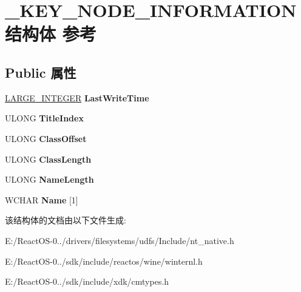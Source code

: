 \hypertarget{struct___k_e_y___n_o_d_e___i_n_f_o_r_m_a_t_i_o_n}{}\section{\+\_\+\+K\+E\+Y\+\_\+\+N\+O\+D\+E\+\_\+\+I\+N\+F\+O\+R\+M\+A\+T\+I\+O\+N结构体 参考}
\label{struct___k_e_y___n_o_d_e___i_n_f_o_r_m_a_t_i_o_n}
\subsection*{Public 属性}
\begin{DoxyCompactItemize}
\item 
\mbox{\label{struct___k_e_y___n_o_d_e___i_n_f_o_r_m_a_t_i_o_n_a415eb44e25bd63e16bd6a5841fb9bbfd}} 
\hyperlink{union___l_a_r_g_e___i_n_t_e_g_e_r}{L\+A\+R\+G\+E\+\_\+\+I\+N\+T\+E\+G\+ER} {\bfseries Last\+Write\+Time}
\item 
\mbox{\label{struct___k_e_y___n_o_d_e___i_n_f_o_r_m_a_t_i_o_n_aa6a6e32b462385709de17245122708e1}} 
U\+L\+O\+NG {\bfseries Title\+Index}
\item 
\mbox{\label{struct___k_e_y___n_o_d_e___i_n_f_o_r_m_a_t_i_o_n_a43f2b41392f988f043de7b3789929dc6}} 
U\+L\+O\+NG {\bfseries Class\+Offset}
\item 
\mbox{\label{struct___k_e_y___n_o_d_e___i_n_f_o_r_m_a_t_i_o_n_aa9ec805f6ee2a519896cadb20c05a87f}} 
U\+L\+O\+NG {\bfseries Class\+Length}
\item 
\mbox{\label{struct___k_e_y___n_o_d_e___i_n_f_o_r_m_a_t_i_o_n_a19fdb49db5dff323f1c6c6910beed7be}} 
U\+L\+O\+NG {\bfseries Name\+Length}
\item 
\mbox{\label{struct___k_e_y___n_o_d_e___i_n_f_o_r_m_a_t_i_o_n_ab0bb8370df87a978f8eda6945e358389}} 
W\+C\+H\+AR {\bfseries Name} \mbox{[}1\mbox{]}
\end{DoxyCompactItemize}


该结构体的文档由以下文件生成\+:\begin{DoxyCompactItemize}
\item 
E\+:/\+React\+O\+S-\/0../drivers/filesystems/udfs/\+Include/nt\+\_\+native.\+h\item 
E\+:/\+React\+O\+S-\/0../sdk/include/reactos/wine/winternl.\+h\item 
E\+:/\+React\+O\+S-\/0../sdk/include/xdk/cmtypes.\+h\end{DoxyCompactItemize}
